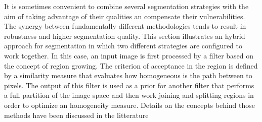 %
%
% 
%
%
%


It is sometimes convenient to combine several segmentation strategies with the
aim of taking advantage of their qualities an compensate their vulnerabilities.
The synergy between fundamentally different methodologies tends to result in
robustness and higher segmentation quality.  This section illustrates an hybrid
approach for segmentation in which two different strategies are configured to
work together. In this case, an input image is first processed by a filter
based on the concept of region growing. The criterion of acceptance in the
region is defined by a similarity measure that evaluates how homogeneous is the
path between to pixels. The output of this filter is used as a prior for
another filter that performs a full partition of the image space and then work
joining and splitting regions in order to optimize an homogeneity measure.
Details on the concepts behind those methods have been discussed in the
litterature
\cite{Angelini2002,Udupa2002,Jin2002,Imielinska2001,Imielinska2000a,Imielinska2000b}





